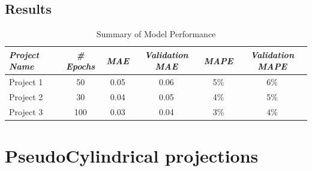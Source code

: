 \subsection{Results}
\begin{table}[ht]
    \centering
    \caption{Summary of Model Performance}
    \label{cylindrical_results_table}
    \renewcommand{\arraystretch}{1.2} %
    \begin{tabular}{|l|c|c|c|c|c|}
        \hline
        \rowcolor[gray]{0.9}
        \textbf{\emph{Project Name}} & \textbf{\emph{\# Epochs}} & \textbf{\emph{MAE}} & \textbf{\emph{Validation MAE}} & \textbf{\emph{MAPE}} & \textbf{\emph{Validation MAPE}} \\ \hline
        Project 1                    & 50                        & 0.05                & 0.06                           & 5\%                  & 6\%                             \\ \hline
        Project 2                    & 30                        & 0.04                & 0.05                           & 4\%                  & 5\%                             \\ \hline
        Project 3                    & 100                       & 0.03                & 0.04                           & 3\%                  & 4\%                             \\ \hline
    \end{tabular}
\end{table}


\newpage
\section{PseudoCylindrical projections}
